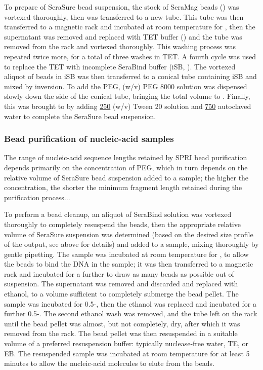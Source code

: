 To prepare  of SeraSure bead suspension, the stock of SeraMag beads () was vortexed thoroughly, then  was transferred to a new tube. This tube was then transferred to a magnetic rack and incubated at room temperature for , then the supernatant was removed and replaced with  TET buffer () and the tube was removed from the rack and vortexed thoroughly. This washing process was repeated twice more, for a total of three washes in TET. A fourth cycle was used to replace the TET with incomplete SeraBind buffer (iSB, ). The vortexed  aliquot of beads in iSB was then transferred to a conical tube containing  iSB and mixed by inversion. To add the PEG,   (w/v) PEG 8000 solution was dispensed slowly down the side of the conical tube, bringing the total volume to . Finally, this was brought to  by adding \ul{250}  (w/v) Tween 20 solution and \ul{750} autoclaved water to complete the SeraSure bead suspension.


\subsubsection{Bead purification of nucleic-acid samples}

The range of nucleic-acid sequence lengths retained by SPRI bead purification depends primarily on the concentration of PEG, which in turn depends on the relative volume of SeraSure bead suspension added to a sample; the higher the concentration, the shorter the minimum fragment length retained during the purification process... %

To perform a bead cleanup, an aliquot of SeraBind solution was vortexed thoroughly to completely resuspend the beads, then the appropriate relative volume of SeraSure suspension was determined (based on the desired size profile of the output, see above for details) and added to a sample, mixing thoroughly by gentle pipetting. The sample was incubated at room temperature for , to allow the beads to bind the DNA in the sample; it was then transferred to a magnetic rack %
and incubated for a further  to draw as many beads as possible out of suspension. The supernatant was removed and discarded and replaced with  ethanol, to a volume sufficient to completely submerge the bead pellet. The sample was incubated for 0.5-, then the ethanol was replaced and incubated for a further 0.5-. The second ethanol wash was removed, and the tube left on the rack until the bead pellet was almost, but not completely, dry, after which it was removed from the rack. The bead pellet was then resuspended in a suitable volume of a preferred resuspension buffer: typically nuclease-free water, TE, or EB. The resuspended sample was incubated at room temperature for at least 5 minutes to allow the nucleic-acid molecules to elute from the beads. 

